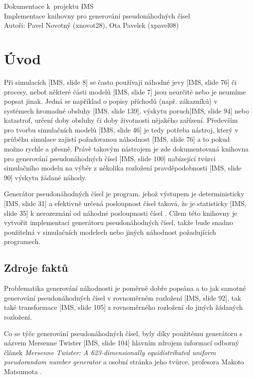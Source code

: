 \documentclass[a4paper,11pt]{article}
\begin{document}
\begin{center}
  \Huge
  Dokumentace k~projektu IMS\\
  \Large
  Implementace knihovny pro generování pseudonáhodných čísel\\
  \large
  Autoři: Pavel Novotný (xnovot28), Ota Pavelek (xpavel08)

\end{center}
\section{Úvod}
Při simulacích [IMS, slide 8] se často používají náhodné jevy [IMS, slide 76] či procesy, neboť některé části modelů [IMS, slide 7] jsou neurčité nebo je neumíme popsat jinak. Jedná se například o popisy příchodů (např. zákazníků) v systémech hromadné obsluhy [IMS, slide 139], výskytu poruch[IMS, slide 94] nebo katastrof, určení doby obsluhy či doby životnosti nějakého zařízení. Především pro tvorbu simulačních modelů [IMS, slide 46] je tedy potřeba nástroj, který v průběhu simulace zajistí požadovanou náhodnost [IMS, slide 76] a to pokud možno rychle a přesně. Právě takovým nástrojem je zde dokumentovaná knihovna pro generování pseudonáhodných čísel [IMS, slide 100] nabízející tvůrci simulačního modelu na výběr z několika rozložení pravděpodobnosti [IMS, slide 90] výskytu žádané náhody.

Generátor pseudonáhodných čísel je program, jehož výstupem je deterministicky [IMS, slide 31] a efektivně určená posloupnost čísel taková, že je statisticky [IMS, slide 35] k nerozeznání od náhodné posloupnosti čísel \cite{wiki}. Cílem této knihovny je vytvořit implementaci generátoru pseudonáhodných čísel, takže bude snadno použitelná v simulačních modelech nebo jiných náhodnost požadujících programech.

\subsection{Zdroje faktů}
Problematika generování náhodnosti je poměrně dobře popsána a to jak samotné generování pseudonáhodných čísel v rovnoměrném rozložení [IMS, slide 92], tak také transformace [IMS, slide 105] z rovnoměrného rozložení do jiných žádaných rozložení.

Co se týče generování pseudonáhodných čísel, byly díky použitému generátoru s názvem Mersenne Twister [IMS, slide 104] hlavním zdrojem informací odborný článek \emph{Mersenne Twister: A 623-dimensionally equidistributed uniform pseudorandom number generator} \cite{Matsumoto} a osobní stránka jeho tvůrce, profesora Makoto Matsumota \cite{Matsumoto2}.
\end{document}
